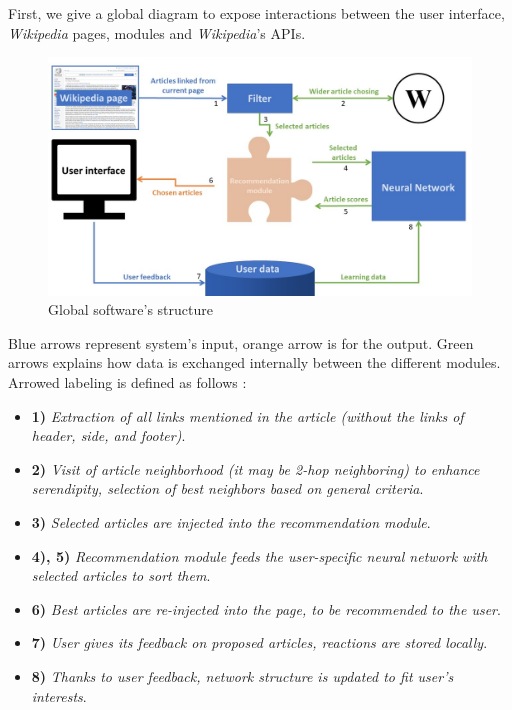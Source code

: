 \documentclass[11pt]{article}
\theoremstyle{plain}
\theoremstyle{definition}
\theoremstyle{remark}
\begin{document}
First, we give a global diagram to expose interactions between the user interface, \textit{Wikipedia} pages, modules and \textit{Wikipedia}'s APIs. 

\begin{figure}[h!]
	\centering
    \includegraphics[width=400pt]{diagram.png}
    \caption{Global software's structure}
    \label{arch_glo}
\end{figure}

Blue arrows represent system's input, orange arrow is for the output. Green arrows explains how data is exchanged internally between the different modules. Arrowed labeling is defined as follows :
\begin{itemize}
\item \textbf{1)} \textit{Extraction of all links mentioned in the article (without the links of header, side, and footer)}.
\item \textbf{2)} \textit{Visit of article neighborhood (it may be 2-hop neighboring) to enhance serendipity, selection of best neighbors based on general criteria}.
\item \textbf{3)} \textit{Selected articles are injected into the recommendation module}.
\item \textbf{4), 5)} \textit{Recommendation module feeds the user-specific neural network with selected articles to sort them}.
\item \textbf{6)} \textit{Best articles are re-injected into the page, to be recommended to the user}.
\item \textbf{7)} \textit{User gives its feedback on proposed articles, reactions are stored locally}.
\item \textbf{8)} \textit{Thanks to user feedback, network structure is updated to fit user's interests}.
\end{itemize}
\end{document}
